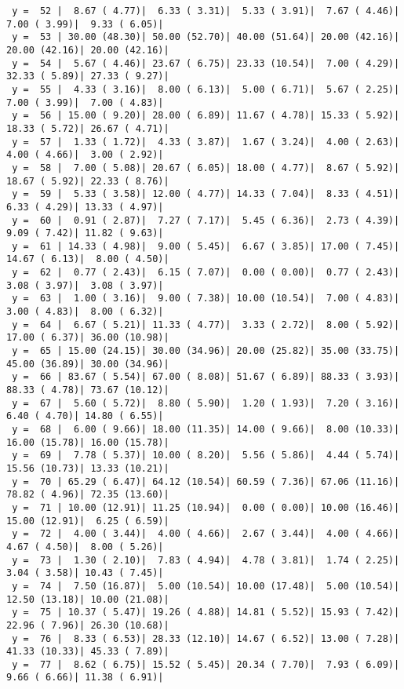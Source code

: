 \documentclass[10pt]{article}
\begin{document}
\begin{Verbatim}
 y =  52 |  8.67 ( 4.77)|  6.33 ( 3.31)|  5.33 ( 3.91)|  7.67 ( 4.46)|  7.00 ( 3.99)|  9.33 ( 6.05)|
 y =  53 | 30.00 (48.30)| 50.00 (52.70)| 40.00 (51.64)| 20.00 (42.16)| 20.00 (42.16)| 20.00 (42.16)|
 y =  54 |  5.67 ( 4.46)| 23.67 ( 6.75)| 23.33 (10.54)|  7.00 ( 4.29)| 32.33 ( 5.89)| 27.33 ( 9.27)|
 y =  55 |  4.33 ( 3.16)|  8.00 ( 6.13)|  5.00 ( 6.71)|  5.67 ( 2.25)|  7.00 ( 3.99)|  7.00 ( 4.83)|
 y =  56 | 15.00 ( 9.20)| 28.00 ( 6.89)| 11.67 ( 4.78)| 15.33 ( 5.92)| 18.33 ( 5.72)| 26.67 ( 4.71)|
 y =  57 |  1.33 ( 1.72)|  4.33 ( 3.87)|  1.67 ( 3.24)|  4.00 ( 2.63)|  4.00 ( 4.66)|  3.00 ( 2.92)|
 y =  58 |  7.00 ( 5.08)| 20.67 ( 6.05)| 18.00 ( 4.77)|  8.67 ( 5.92)| 18.67 ( 5.92)| 22.33 ( 8.76)|
 y =  59 |  5.33 ( 3.58)| 12.00 ( 4.77)| 14.33 ( 7.04)|  8.33 ( 4.51)|  6.33 ( 4.29)| 13.33 ( 4.97)|
 y =  60 |  0.91 ( 2.87)|  7.27 ( 7.17)|  5.45 ( 6.36)|  2.73 ( 4.39)|  9.09 ( 7.42)| 11.82 ( 9.63)|
 y =  61 | 14.33 ( 4.98)|  9.00 ( 5.45)|  6.67 ( 3.85)| 17.00 ( 7.45)| 14.67 ( 6.13)|  8.00 ( 4.50)|
 y =  62 |  0.77 ( 2.43)|  6.15 ( 7.07)|  0.00 ( 0.00)|  0.77 ( 2.43)|  3.08 ( 3.97)|  3.08 ( 3.97)|
 y =  63 |  1.00 ( 3.16)|  9.00 ( 7.38)| 10.00 (10.54)|  7.00 ( 4.83)|  3.00 ( 4.83)|  8.00 ( 6.32)|
 y =  64 |  6.67 ( 5.21)| 11.33 ( 4.77)|  3.33 ( 2.72)|  8.00 ( 5.92)| 17.00 ( 6.37)| 36.00 (10.98)|
 y =  65 | 15.00 (24.15)| 30.00 (34.96)| 20.00 (25.82)| 35.00 (33.75)| 45.00 (36.89)| 30.00 (34.96)|
 y =  66 | 83.67 ( 5.54)| 67.00 ( 8.08)| 51.67 ( 6.89)| 88.33 ( 3.93)| 88.33 ( 4.78)| 73.67 (10.12)|
 y =  67 |  5.60 ( 5.72)|  8.80 ( 5.90)|  1.20 ( 1.93)|  7.20 ( 3.16)|  6.40 ( 4.70)| 14.80 ( 6.55)|
 y =  68 |  6.00 ( 9.66)| 18.00 (11.35)| 14.00 ( 9.66)|  8.00 (10.33)| 16.00 (15.78)| 16.00 (15.78)|
 y =  69 |  7.78 ( 5.37)| 10.00 ( 8.20)|  5.56 ( 5.86)|  4.44 ( 5.74)| 15.56 (10.73)| 13.33 (10.21)|
 y =  70 | 65.29 ( 6.47)| 64.12 (10.54)| 60.59 ( 7.36)| 67.06 (11.16)| 78.82 ( 4.96)| 72.35 (13.60)|
 y =  71 | 10.00 (12.91)| 11.25 (10.94)|  0.00 ( 0.00)| 10.00 (16.46)| 15.00 (12.91)|  6.25 ( 6.59)|
 y =  72 |  4.00 ( 3.44)|  4.00 ( 4.66)|  2.67 ( 3.44)|  4.00 ( 4.66)|  4.67 ( 4.50)|  8.00 ( 5.26)|
 y =  73 |  1.30 ( 2.10)|  7.83 ( 4.94)|  4.78 ( 3.81)|  1.74 ( 2.25)|  3.04 ( 3.58)| 10.43 ( 7.45)|
 y =  74 |  7.50 (16.87)|  5.00 (10.54)| 10.00 (17.48)|  5.00 (10.54)| 12.50 (13.18)| 10.00 (21.08)|
 y =  75 | 10.37 ( 5.47)| 19.26 ( 4.88)| 14.81 ( 5.52)| 15.93 ( 7.42)| 22.96 ( 7.96)| 26.30 (10.68)|
 y =  76 |  8.33 ( 6.53)| 28.33 (12.10)| 14.67 ( 6.52)| 13.00 ( 7.28)| 41.33 (10.33)| 45.33 ( 7.89)|
 y =  77 |  8.62 ( 6.75)| 15.52 ( 5.45)| 20.34 ( 7.70)|  7.93 ( 6.09)|  9.66 ( 6.66)| 11.38 ( 6.91)|

\end{Verbatim}
\end{document}
